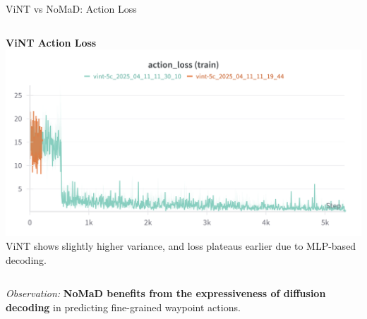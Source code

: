 \documentclass{beamer}
\begin{document}
\begin{frame}{ViNT vs NoMaD: Action Loss}
\begin{columns}
        \begin{column}{0.48\textwidth}
            \begin{block}{\centering \small \textbf{ViNT Action Loss}}
                \centering
                \includegraphics[width=\textwidth]{images/action_train_vint.png}
                \tiny ViNT shows slightly higher variance, and loss plateaus earlier due to MLP-based decoding.
            \end{block}
        \end{column}
    \end{columns}

    \vspace{0.5em}
    \centering
    \textit{Observation:} \textbf{NoMaD benefits from the expressiveness of diffusion decoding} in predicting fine-grained waypoint actions.
\end{frame}
\end{document}
